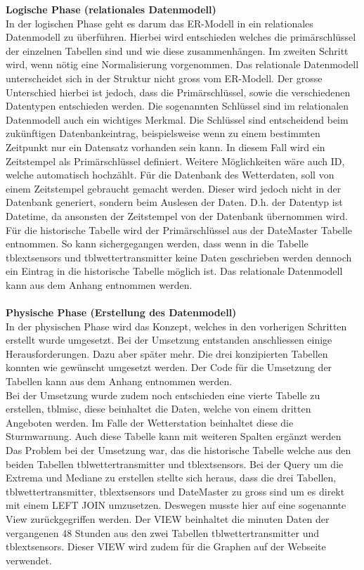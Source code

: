 \textbf{Logische Phase (relationales Datenmodell)}\\

In der logischen Phase geht es darum das ER-Modell in ein relationales Datenmodell zu überführen. Hierbei wird entschieden welches die primärschlüssel der einzelnen Tabellen sind und wie diese zusammenhängen. Im zweiten Schritt wird, wenn nötig eine Normalisierung vorgenommen. Das relationale Datenmodell unterscheidet sich in der Struktur nicht gross vom ER-Modell. Der grosse Unterschied hierbei ist jedoch, dass die Primärschlüssel, sowie die verschiedenen Datentypen entschieden werden. Die sogenannten Schlüssel sind im relationalen Datenmodell auch ein wichtiges Merkmal. Die Schlüssel sind entscheidend beim zukünftigen Datenbankeintrag, beispielsweise wenn zu einem bestimmten Zeitpunkt nur ein Datensatz vorhanden sein kann. In diesem Fall wird ein Zeitstempel als Primärschlüssel definiert. Weitere Möglichkeiten wäre auch ID, welche automatisch hochzählt. Für die Datenbank des Wetterdaten, soll von einem Zeitstempel gebraucht gemacht werden. Dieser wird jedoch nicht in der Datenbank generiert, sondern beim Auslesen der Daten. D.h. der Datentyp ist Datetime, da ansonsten der Zeitstempel von der Datenbank übernommen wird. Für die historische Tabelle wird der Primärschlüssel aus der DateMaster Tabelle entnommen. So kann sichergegangen werden, dass wenn in die Tabelle tblextsensors und tblwettertransmitter keine Daten geschrieben werden dennoch ein Eintrag in die historische Tabelle möglich ist. Das relationale Datenmodell kann aus dem Anhang  entnommen werden.\\ \\


\textbf{Physische Phase (Erstellung des Datenmodell)}\\

In der physischen Phase wird das Konzept, welches in den vorherigen Schritten erstellt wurde umgesetzt. Bei der Umsetzung entstanden anschliessen einige Herausforderungen. Dazu aber später mehr. Die drei konzipierten Tabellen konnten wie gewünscht umgesetzt werden. Der Code für die Umsetzung der Tabellen kann aus dem Anhang entnommen werden.\\
Bei der Umsetzung wurde zudem noch entschieden eine vierte Tabelle zu erstellen, tblmisc, diese beinhaltet die Daten, welche von einem dritten Angeboten werden. Im Falle der Wetterstation beinhaltet diese die Sturmwarnung. Auch diese Tabelle kann mit weiteren Spalten ergänzt werden 
Das Problem bei der Umsetzung war, das die historische Tabelle welche aus den beiden Tabellen tblwettertransmitter und tblextsensors. Bei der Query um die Extrema und Mediane zu erstellen stellte sich heraus, dass die drei Tabellen, tblwettertransmitter, tblextsensors und DateMaster zu gross sind um es direkt mit einem LEFT JOIN umzusetzen. Deswegen musste hier auf eine sogenannte View zurückgegriffen werden. Der VIEW beinhaltet die minuten Daten der vergangenen 48 Stunden aus den zwei Tabellen tblwettertransmitter und tblextsensors. Dieser VIEW wird zudem für die Graphen auf der Webseite verwendet. 


